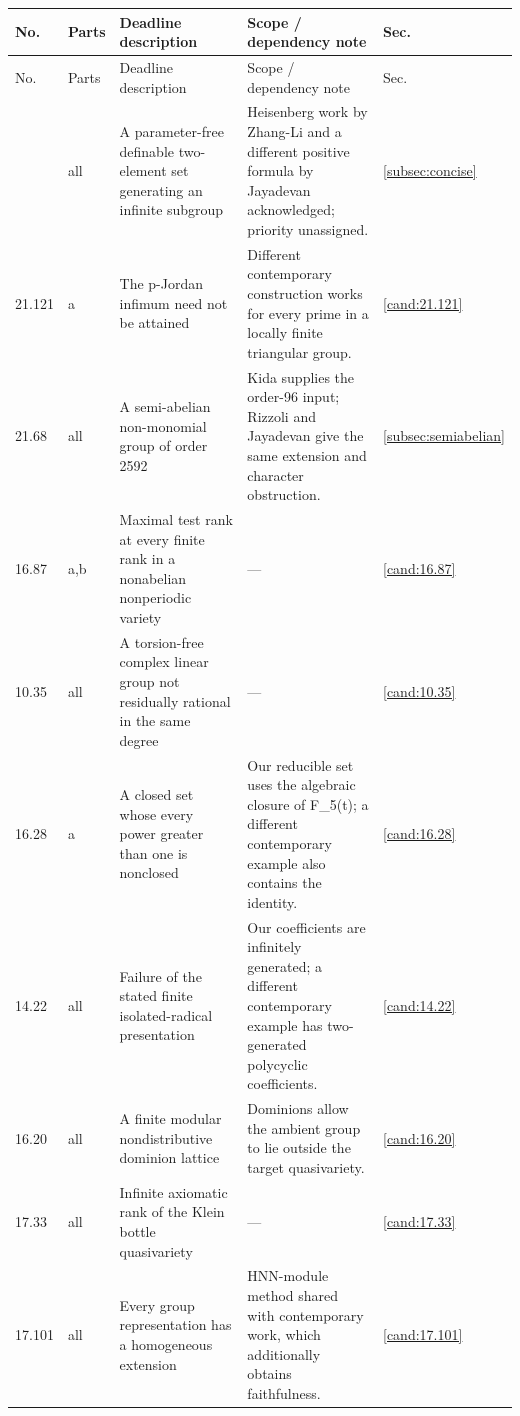 \small
\begin{longtable}{@{}p{}p{}>{\raggedright\arraybackslash}p{}>{\raggedright\arraybackslash}p{}p{}@{}}
\toprule
No. & Parts & Deadline description & Scope / dependency note & Sec.\\
\midrule
\endfirsthead
\toprule
No. & Parts & Deadline description & Scope / dependency note & Sec.\\
\midrule
\endhead
\bottomrule
\endfoot
21.106 & all & A parameter-free definable two-element set generating an infinite subgroup & Heisenberg work by Zhang-Li and a different positive formula by Jayadevan acknowledged; priority unassigned. & \ref{subsec:concise} \\
21.121 & a & The p-Jordan infimum need not be attained & Different contemporary construction works for every prime in a locally finite triangular group. & \ref{cand:21.121} \\
21.68 & all & A semi-abelian non-monomial group of order 2592 & Kida supplies the order-96 input; Rizzoli and Jayadevan give the same extension and character obstruction. & \ref{subsec:semiabelian} \\
16.87 & a,b & Maximal test rank at every finite rank in a nonabelian nonperiodic variety & --- & \ref{cand:16.87} \\
10.35 & all & A torsion-free complex linear group not residually rational in the same degree & --- & \ref{cand:10.35} \\
16.28 & a & A closed set whose every power greater than one is nonclosed & Our reducible set uses the algebraic closure of F\_5(t); a different contemporary example also contains the identity. & \ref{cand:16.28} \\
14.22 & all & Failure of the stated finite isolated-radical presentation & Our coefficients are infinitely generated; a different contemporary example has two-generated polycyclic coefficients. & \ref{cand:14.22} \\
16.20 & all & A finite modular nondistributive dominion lattice & Dominions allow the ambient group to lie outside the target quasivariety. & \ref{cand:16.20} \\
17.33 & all & Infinite axiomatic rank of the Klein bottle quasivariety & --- & \ref{cand:17.33} \\
17.101 & all & Every group representation has a homogeneous extension & HNN-module method shared with contemporary work, which additionally obtains faithfulness. & \ref{cand:17.101} \\

\end{longtable}

